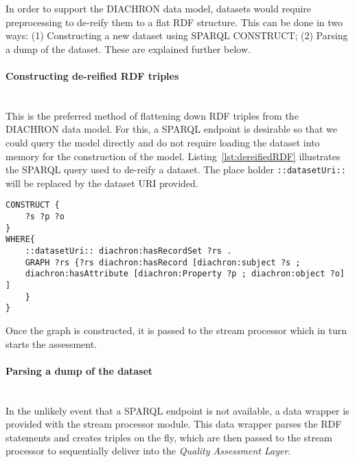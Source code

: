 In order to support the DIACHRON data model, datasets would require preprocessing to de-reify them to a flat RDF structure.
This can be done in two ways: (1) Constructing a new dataset using SPARQL CONSTRUCT; (2) Parsing a dump of the dataset.
These are explained further below.

\paragraph{Constructing de-reified RDF triples}~\\
This is the preferred method of flattening down RDF triples from the DIACHRON data model.
For this, a SPARQL endpoint is desirable so that we could query the model directly and do not require loading the dataset into memory for the construction of the model.
Listing~\ref{lst:dereifiedRDF} illustrates the SPARQL query used to de-reify a dataset.
The place holder \texttt{::datasetUri::} will be replaced by the dataset URI provided.
\begin{lstlisting}[language=sparql,label=lst:dereifiedRDF]
CONSTRUCT {
	?s ?p ?o
}
WHERE{
	::datasetUri:: diachron:hasRecordSet ?rs .
	GRAPH ?rs {?rs diachron:hasRecord [diachron:subject ?s ;
	diachron:hasAttribute [diachron:Property ?p ; diachron:object ?o] ]
	}
}
\end{lstlisting}
Once the graph is constructed, it is passed to the stream processor which in turn starts the assessment.

\paragraph{Parsing a dump of the dataset}~\\
In the unlikely event that a SPARQL endpoint is not available, a data wrapper is provided with the stream processor module.
This data wrapper parses the RDF statements and creates triples on the fly, which are then passed to the stream processor to sequentially deliver into the \emph{Quality Assessment Layer}.

